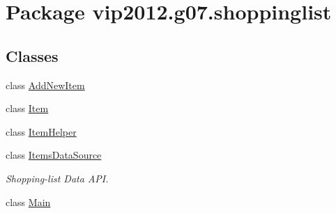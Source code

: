 \hypertarget{namespacevip2012_1_1g07_1_1shoppinglist}{\section{Package vip2012.\-g07.\-shoppinglist}
\label{df/d2f/namespacevip2012_1_1g07_1_1shoppinglist}
}
\subsection*{Classes}
\begin{DoxyCompactItemize}
\item 
class \hyperlink{classvip2012_1_1g07_1_1shoppinglist_1_1AddNewItem}{Add\-New\-Item}
\item 
class \hyperlink{classvip2012_1_1g07_1_1shoppinglist_1_1Item}{Item}
\item 
class \hyperlink{classvip2012_1_1g07_1_1shoppinglist_1_1ItemHelper}{Item\-Helper}
\item 
class \hyperlink{classvip2012_1_1g07_1_1shoppinglist_1_1ItemsDataSource}{Items\-Data\-Source}
\begin{DoxyCompactList}\small\item\em Shopping-\/list Data A\-P\-I. \end{DoxyCompactList}\item 
class \hyperlink{classvip2012_1_1g07_1_1shoppinglist_1_1Main}{Main}
\end{DoxyCompactItemize}
